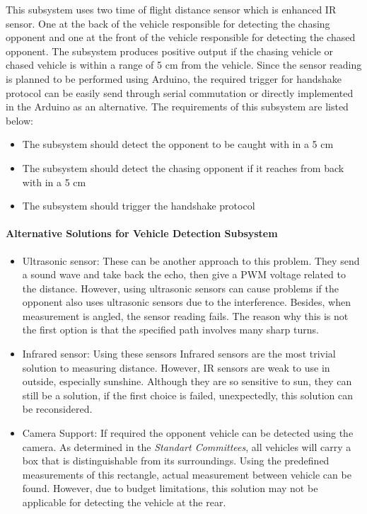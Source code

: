 \documentclass[a4paper,12pt]{article}
\begin{document}
	 This subsystem uses two time of flight distance sensor which is enhanced IR sensor. One at the back of the vehicle responsible for detecting the chasing opponent and one at the front of the vehicle responsible for detecting the chased opponent. The subsystem produces positive output if the chasing vehicle or chased vehicle is within a range of 5 cm from the vehicle. Since the sensor reading is planned to be performed using Arduino, the required trigger for handshake protocol can be  easily send through serial commutation or directly implemented in the Arduino as an alternative. The requirements of this subsystem are listed below:
	
	\begin{itemize}
		\item The subsystem should detect the opponent to be caught with in a 5 cm 
		\item The subsystem should detect the chasing opponent if it reaches from back with in a 5 cm 
		\item The subsystem should trigger the handshake protocol 
	\end{itemize}
	
	\paragraph{Alternative Solutions for Vehicle Detection Subsystem}
	\begin{itemize}
		\item {Ultrasonic sensor:} These can be another approach to this problem. They send a sound wave and take back the echo, then give a PWM voltage related to the distance. However, using ultrasonic sensors can cause problems if the opponent also uses ultrasonic sensors due to the interference. Besides, when measurement is angled, the sensor reading fails. The reason why this is not the first option is that the specified path involves many sharp turns.
		
		\item {Infrared sensor:} Using these sensors Infrared sensors are the most trivial solution to measuring distance. However, IR sensors are weak to use in outside, especially sunshine. Although they are so sensitive to sun, they can still be a solution, if the first choice is failed, unexpectedly, this solution can be reconsidered.
		
		\item {Camera Support:} If required the opponent vehicle can be detected using the camera. As determined in the \textit{Standart Committees}, all vehicles will carry a box that is distinguishable from its surroundings. Using the predefined measurements of this rectangle, actual measurement between vehicle can be found. However, due to budget limitations, this solution may not be applicable for detecting the vehicle at the rear.
		
	\end{itemize}
	
\end{document}
